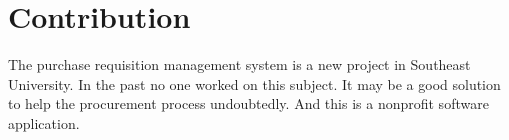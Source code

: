 \documentclass[12pt]{report} %
\begin{document}
\section*{Contribution}

The purchase requisition management system is a new project in Southeast University. In the past no one worked on this subject. It may be a good solution to help the procurement process undoubtedly. And this is a nonprofit software application.








\end{document}
